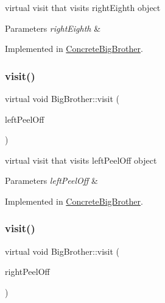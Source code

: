 virtual visit that visits right\+Eighth object 
\begin{DoxyParams}{Parameters}
{\em right\+Eighth} & \\
\hline
\end{DoxyParams}


Implemented in \mbox{\hyperlink{class_concrete_big_brother_a693ed9fb8fb4a18843f6a8d8abb878d4}{Concrete\+Big\+Brother}}.

\mbox{\label{class_big_brother_abcc93629cd4baa43ed2c729dcc97f080}} 
\subsubsection{\texorpdfstring{visit()}{visit()}\hspace{0.1cm}{\footnotesize\ttfamily [3/7]}}
{\footnotesize\ttfamily virtual void Big\+Brother\+::visit (\begin{DoxyParamCaption}\item[{\mbox{\hyperlink{class_left_peel_off}{Left\+Peel\+Off}} $\ast$}]{left\+Peel\+Off }\end{DoxyParamCaption})\hspace{0.3cm}{\ttfamily [pure virtual]}}

virtual visit that visits left\+Peel\+Off object 
\begin{DoxyParams}{Parameters}
{\em left\+Peel\+Off} & \\
\hline
\end{DoxyParams}


Implemented in \mbox{\hyperlink{class_concrete_big_brother_ab74422b56214550d74c956f408960d87}{Concrete\+Big\+Brother}}.

\mbox{\label{class_big_brother_a2da409f26a8ecda1b6d63ed295dc732d}} 
\subsubsection{\texorpdfstring{visit()}{visit()}\hspace{0.1cm}{\footnotesize\ttfamily [4/7]}}
{\footnotesize\ttfamily virtual void Big\+Brother\+::visit (\begin{DoxyParamCaption}\item[{\mbox{\hyperlink{class_right_peel_off}{Right\+Peel\+Off}} $\ast$}]{right\+Peel\+Off }\end{DoxyParamCaption})\hspace{0.3cm}{\ttfamily [pure virtual]}}

